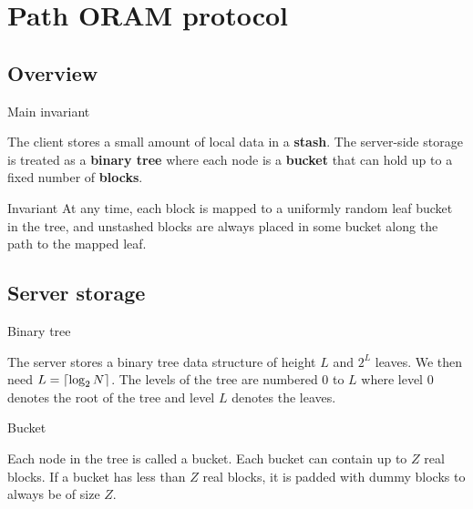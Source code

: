 \section{Path ORAM protocol}

	\subsection{Overview}

		\begin{frame}{Main invariant}
			
			The client stores a small amount of local data in a \textbf{stash}.
			The server-side storage is treated as a \textbf{binary tree} where each node is a \textbf{bucket} that can hold up to a fixed number of \textbf{blocks}.

			\begin{block}{Invariant}
				At any time, each block is mapped to a uniformly random leaf bucket in the tree, and unstashed blocks are always placed in some bucket along the path to the mapped leaf.
			\end{block}

		\end{frame}

	\subsection{Server storage}

		\begin{frame}{Binary tree}
			
			The server stores a binary tree data structure of height $L$ and $2^L$ leaves.
			We then need $L = \ceil*{ \log_2 N }$. 
			The levels of the tree are numbered $0$ to $L$ where level $0$ denotes the root of the tree and level $L$ denotes the leaves.

		\end{frame}

		\begin{frame}{Bucket}
			
			Each node in the tree is called a bucket. 
			Each bucket can contain up to $Z$ real blocks. 
			If a bucket has less than $Z$ real blocks, it is padded with dummy blocks to always be of size $Z$.

		\end{frame}

